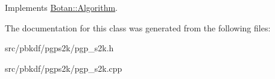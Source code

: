 Implements \hyperlink{classBotan_1_1Algorithm_a42d3ee39e051eba01ecace201fe1e6fd}{Botan\-::\-Algorithm}.



The documentation for this class was generated from the following files\-:\begin{DoxyCompactItemize}
\item 
src/pbkdf/pgps2k/pgp\-\_\-s2k.\-h\item 
src/pbkdf/pgps2k/pgp\-\_\-s2k.\-cpp\end{DoxyCompactItemize}
